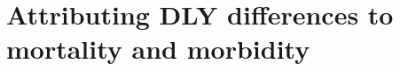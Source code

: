 \documentclass[20pt]{beamer}
\begin{document}
\begin{frame}[plain]
\begin{overprint}
\begin{center}
\end{center}
\end{overprint}
\end{frame}

\section{Attributing DLY differences to mortality and morbidity}
\end{document}
